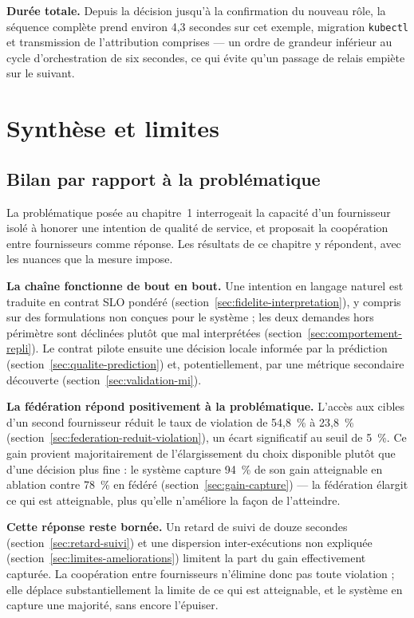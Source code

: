 \textbf{Durée totale.} Depuis la décision jusqu'à la confirmation du nouveau rôle, la séquence complète prend environ 4,3 secondes sur cet exemple, migration \texttt{kubectl} et transmission de l'attribution comprises — un ordre de grandeur inférieur au cycle d'orchestration de six secondes, ce qui évite qu'un passage de relais empiète sur le suivant.

\newpage
\section{Synthèse et limites}
\label{sec:synthese-limites}

\subsection{Bilan par rapport à la problématique}
\label{sec:bilan-problematique}

La problématique posée au chapitre~1 interrogeait la capacité d'un fournisseur isolé à honorer une intention de qualité de service, et proposait la coopération entre fournisseurs comme réponse. Les résultats de ce chapitre y répondent, avec les nuances que la mesure impose.

\textbf{La chaîne fonctionne de bout en bout.} Une intention en langage naturel est traduite en contrat SLO pondéré (section~\ref{sec:fidelite-interpretation}), y compris sur des formulations non conçues pour le système ; les deux demandes hors périmètre sont déclinées plutôt que mal interprétées (section~\ref{sec:comportement-repli}). Le contrat pilote ensuite une décision locale informée par la prédiction (section~\ref{sec:qualite-prediction}) et, potentiellement, par une métrique secondaire découverte (section~\ref{sec:validation-mi}).

\textbf{La fédération répond positivement à la problématique.} L'accès aux cibles d'un second fournisseur réduit le taux de violation de 54,8~\% à 23,8~\% (section~\ref{sec:federation-reduit-violation}), un écart significatif au seuil de 5~\%. Ce gain provient majoritairement de l'élargissement du choix disponible plutôt que d'une décision plus fine : le système capture 94~\% de son gain atteignable en ablation contre 78~\% en fédéré (section~\ref{sec:gain-capture}) — la fédération élargit ce qui est atteignable, plus qu'elle n'améliore la façon de l'atteindre.

\textbf{Cette réponse reste bornée.} Un retard de suivi de douze secondes (section~\ref{sec:retard-suivi}) et une dispersion inter-exécutions non expliquée (section~\ref{sec:limites-ameliorations}) limitent la part du gain effectivement capturée. La coopération entre fournisseurs n'élimine donc pas toute violation ; elle déplace substantiellement la limite de ce qui est atteignable, et le système en capture une majorité, sans encore l'épuiser.

